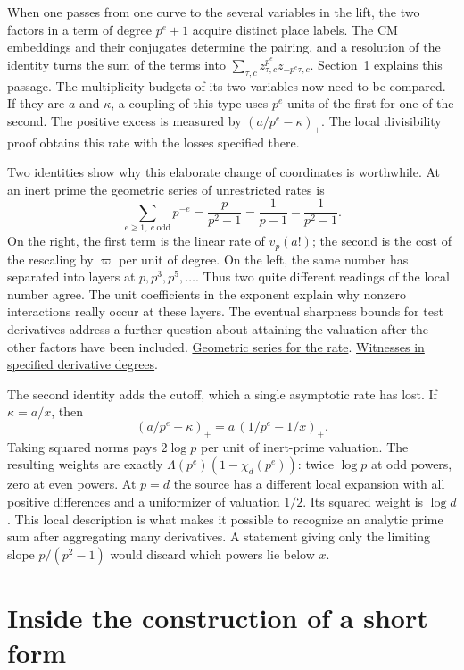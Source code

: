 \documentclass[11pt,letterpaper]{article}
\newcommand{\sref}[2]{\href{https://github.com/VladimirReshetnikov/ProveIt/blob/d8415e76ad850651f8c0083afe689dd9f4a45a10/Analysis/GeneralizedRiemannHypothesis/vendor/grh-lean/grh/src/#1.lean}{#2}}
\begin{document}
When one passes from one curve to the several variables in the lift, the two factors in a term of degree \(p^e+1\) acquire distinct place labels. The CM embeddings and their conjugates determine the pairing, and a resolution of the identity turns the sum of the terms into \(\sum_{\tau,c}z_{\tau,c}^{p^e}z_{-p^e\tau,c}\). Section~\ref{sec:inside-short} explains this passage. The multiplicity budgets of its two variables now need to be compared. If they are \(a\) and \(\kappa\), a coupling of this type uses \(p^e\) units of the first for one of the second. The positive excess is measured by \((a/p^e-\kappa)_+\). The local divisibility proof obtains this rate with the losses specified there.

Two identities show why this elaborate change of coordinates is worthwhile. At an inert prime the geometric series of unrestricted rates is
\[
 \sum_{e\ge1,\ e\ \mathrm{odd}}p^{-e}=\frac{p}{p^2-1}
              =\frac1{p-1}-\frac1{p^2-1}.
\]
On the right, the first term is the linear rate of \(v_p(a!)\); the second is the cost of the rescaling by \(\varpi\) per unit of degree. On the left, the same number has separated into layers at \(p,p^3,p^5,\ldots\). Thus two quite different readings of the local number agree. The unit coefficients in the exponent explain why nonzero interactions really occur at these layers. The eventual sharpness bounds for test derivatives address a further question about attaining the valuation after the other factors have been included. \sref{Lib/CM/FormalGroup/PrimeNotation}{Geometric series for the rate}. \sref{New/Derivatives/Sharpness/OneCurve}{Witnesses in specified derivative degrees}.

The second identity adds the cutoff, which a single asymptotic rate has lost. If \(\kappa=a/x\), then
\[
   (a/p^e-\kappa)_+=a\,(1/p^e-1/x)_+ .
\]
Taking squared norms pays \(2\log p\) per unit of inert-prime valuation. The resulting weights are exactly \(\Lambda(p^e)(1-\chi_d(p^e))\): twice \(\log p\) at odd powers, zero at even powers. At \(p=d\) the source has a different local expansion with all positive differences and a uniformizer of valuation \(1/2\). Its squared weight is \(\log d\). This local description is what makes it possible to recognize an analytic prime sum after aggregating many derivatives. A statement giving only the limiting slope \(p/(p^2-1)\) would discard which powers lie below \(x\).

\section{Inside the construction of a short form}\label{sec:inside-short}
\end{document}
